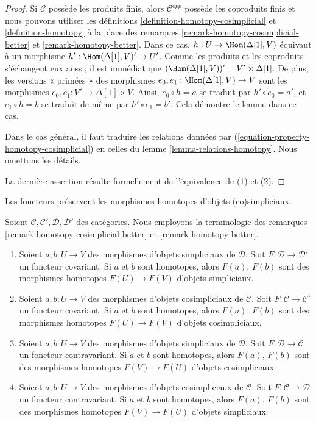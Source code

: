 \begin{proof}
Si $\mathcal{C}$ possède les produits finis, alors $\mathcal{C}^{opp}$
possède les coproduits finis et nous pouvons utiliser les
définitions \ref{definition-homotopy-cosimplicial}
et \ref{definition-homotopy} à la place des
remarques \ref{remark-homotopy-cosimplicial-better} et
\ref{remark-homotopy-better}.
Dans ce cas, $h : U \to \Hom(\Delta[1], V)$ équivaut à un morphisme
$h' : \Hom(\Delta[1], V)' \to U'$.
Comme les produits et les coproduits s'échangent eux aussi, il est immédiat
que $(\Hom(\Delta[1], V))' = V' \times \Delta[1]$.
De plus, les versions « primées » des morphismes
$e_0, e_1 : \Hom(\Delta[1], V) \to V$ sont les morphismes
$e_0, e_1 : V' \to \Delta[1] \times V$.
Ainsi, $e_0 \circ h = a$ se traduit par $h' \circ e_0 = a'$, et
$e_1 \circ h = b$ se traduit de même par $h' \circ e_1 = b'$.
Cela démontre le lemme dans ce cas.

\medskip\noindent
Dans le cas général, il faut traduire les relations données par
(\ref{equation-property-homotopy-cosimplicial}) en celles du
lemme \ref{lemma-relations-homotopy}. Nous omettons les détails.

\medskip\noindent
La dernière assertion résulte formellement de l'équivalence de (1) et (2).
\end{proof}

\begin{lemma}
\label{lemma-functorial-homotopy}
\begin{slogan}
Les foncteurs préservent les morphismes homotopes d'objets (co)simpliciaux.
\end{slogan}
Soient $\mathcal{C}, \mathcal{C}', \mathcal{D}, \mathcal{D}'$ des catégories.
Nous employons la terminologie des remarques
\ref{remark-homotopy-cosimplicial-better} et \ref{remark-homotopy-better}.
\begin{enumerate}
\item Soient $a, b : U \to V$ des morphismes d'objets simpliciaux
de $\mathcal{D}$. Soit $F : \mathcal{D} \to \mathcal{D}'$ un foncteur
covariant. Si $a$ et $b$ sont homotopes, alors $F(a)$, $F(b)$ sont des
morphismes homotopes $F(U) \to F(V)$ d'objets simpliciaux.
\item Soient $a, b : U \to V$ des morphismes d'objets cosimpliciaux
de $\mathcal{C}$. Soit $F : \mathcal{C} \to \mathcal{C}'$ un foncteur
covariant. Si $a$ et $b$ sont homotopes, alors $F(a)$, $F(b)$ sont des
morphismes homotopes $F(U) \to F(V)$ d'objets cosimpliciaux.
\item Soient $a, b : U \to V$ des morphismes d'objets simpliciaux de $\mathcal{D}$.
Soit $F : \mathcal{D} \to \mathcal{C}$ un foncteur contravariant.
Si $a$ et $b$ sont homotopes, alors $F(a)$, $F(b)$ sont des morphismes
homotopes $F(V) \to F(U)$ d'objets cosimpliciaux.
\item Soient $a, b : U \to V$ des morphismes d'objets cosimpliciaux de
$\mathcal{C}$. Soit $F : \mathcal{C} \to \mathcal{D}$ un foncteur
contravariant. Si $a$ et $b$ sont homotopes, alors $F(a)$, $F(b)$ sont des
morphismes homotopes $F(V) \to F(U)$ d'objets simpliciaux.
\end{enumerate}
\end{lemma}

